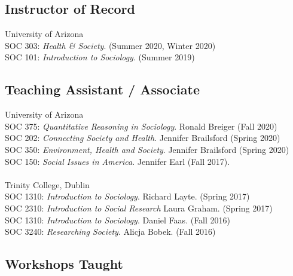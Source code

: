 \subsection*{Instructor of Record}
University of Arizona \\
SOC 303: \emph{Health \& Society}. (Summer 2020, Winter 2020) \\
SOC 101: \emph{Introduction to Sociology}. (Summer 2019)


\begin{comment} 
SOC 101: \emph{Introduction to Sociology}. (Winter 2019) \\ 
SOC 280: \emph{Schools and Society}. (Summer 2018) \\ 
\end{comment}


\subsection*{Teaching Assistant / Associate}
University of Arizona \\
SOC 375: \emph{Quantitative Reasoning in Sociology}. Ronald Breiger (Fall 2020)\\
SOC 202: \emph{Connecting Society and Health}. Jennifer Brailsford (Spring 2020)\\
SOC 350: \emph{Environment, Health and Society}. Jennifer Brailsford (Spring 2020)\\
SOC 150: \emph{Social Issues in America}. Jennifer Earl (Fall 2017). \\
\\
Trinity College, Dublin \\
SOC 1310: \emph{Introduction to Sociology}. Richard Layte. (Spring 2017) \\
SOC 2310: \emph{Introduction to Social Research} Laura Graham. (Spring 2017) \\
SOC 1310: \emph{Introduction to Sociology}. Daniel Faas. (Fall 2016)\\
SOC 3240: \emph{Researching Society}. Alicja Bobek. (Fall 2016)


\subsection*{Workshops Taught}

